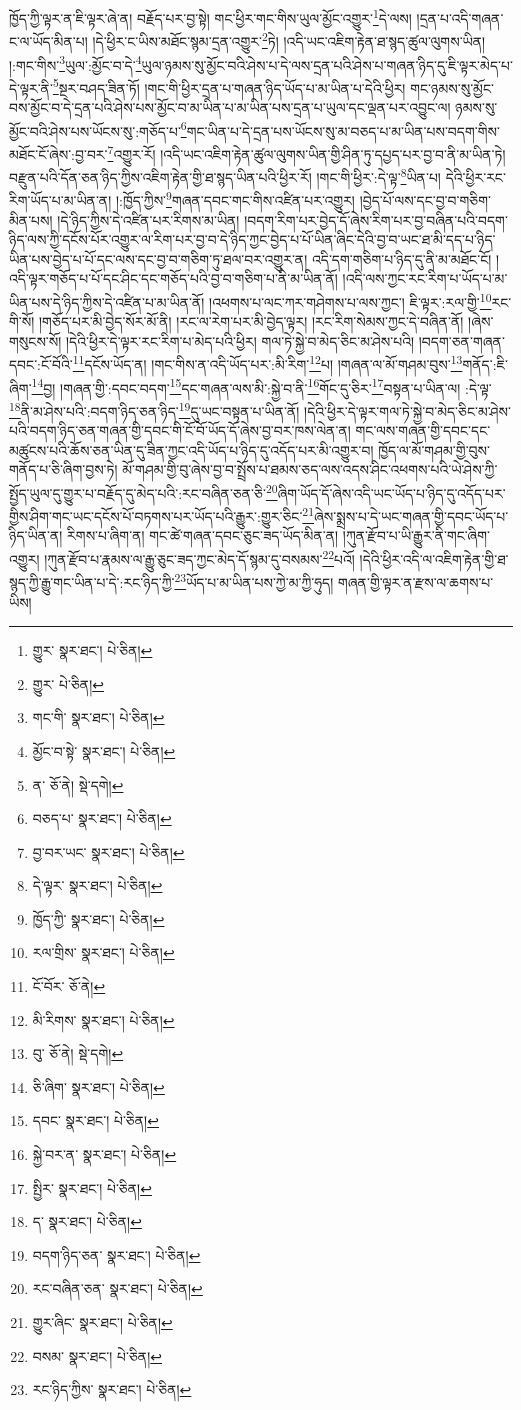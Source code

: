 ཁྱོད་ཀྱི་ལྟར་ན་ཇི་ལྟར་ཞེ་ན། བརྗོད་པར་བྱ་སྟེ། གང་ཕྱིར་གང་གིས་ཡུལ་མྱོང་འགྱུར་\footnote{གྱུར་  སྣར་ཐང་།  པེ་ཅིན། }དེ་ལས། །དྲན་པ་འདི་གཞན་ང་ལ་ཡོད་མིན་པ། །དེ་ཕྱིར་ང་ཡིས་མཐོང་སྙམ་དྲན་འགྱུར་\footnote{གྱུར་  པེ་ཅིན། }ཏེ། །འདི་ཡང་འཇིག་རྟེན་ཐ་སྙད་ཚུལ་ལུགས་ཡིན། །:གང་གིས་\footnote{གང་གི་  སྣར་ཐང་།  པེ་ཅིན། }ཡུལ་:མྱོང་བ་དེ་\footnote{མྱོང་བ་སྟེ་  སྣར་ཐང་།  པེ་ཅིན། }ཡུལ་ཉམས་སུ་མྱོང་བའི་ཤེས་པ་དེ་ལས་དྲན་པའི་ཤེས་པ་གཞན་ཉིད་དུ་ཇི་ལྟར་མེད་པ་དེ་ལྟར་ནི་\footnote{ན་  ཅོ་ནེ།  སྡེ་དགེ། }སྔར་བཤད་ཟིན་ཏོ། །གང་གི་ཕྱིར་དྲན་པ་གཞན་ཉིད་ཡོད་པ་མ་ཡིན་པ་དེའི་ཕྱིར། གང་ཉམས་སུ་མྱོང་བས་མྱོང་བ་དེ་དྲན་པའི་ཤེས་པས་མྱོང་བ་མ་ཡིན་པ་མ་ཡིན་པས་དྲན་པ་ཡུལ་དང་ལྡན་པར་འབྱུང་ལ། ཉམས་སུ་མྱོང་བའི་ཤེས་པས་ཡོངས་སུ་:གཅོད་པ་\footnote{བཅད་པ་  སྣར་ཐང་།  པེ་ཅིན། }གང་ཡིན་པ་དེ་དྲན་པས་ཡོངས་སུ་མ་བཅད་པ་མ་ཡིན་པས་བདག་གིས་མཐོང་ངོ་ཞེས་:བྱ་བར་\footnote{བྱ་བར་ཡང་  སྣར་ཐང་།  པེ་ཅིན། }འགྱུར་རོ། །འདི་ཡང་འཇིག་རྟེན་ཚུལ་ལུགས་ཡིན་གྱི་ཤིན་ཏུ་དཔྱད་པར་བྱ་བ་ནི་མ་ཡིན་ཏེ། བརྫུན་པའི་དོན་ཅན་ཉིད་ཀྱིས་འཇིག་རྟེན་གྱི་ཐ་སྙད་ཡིན་པའི་ཕྱིར་རོ། །གང་གི་ཕྱིར་:དེ་ལྟ་\footnote{དེ་ལྟར་  སྣར་ཐང་།  པེ་ཅིན། }ཡིན་པ། དེའི་ཕྱིར་རང་རིག་ཡོད་པ་མ་ཡིན་ན། །:ཁྱོད་ཀྱིས་\footnote{ཁྱོད་ཀྱི་  སྣར་ཐང་།  པེ་ཅིན། }གཞན་དབང་གང་གིས་འཛིན་པར་འགྱུར། །བྱེད་པོ་ལས་དང་བྱ་བ་གཅིག་མིན་པས། །དེ་ཉིད་ཀྱིས་དེ་འཛིན་པར་རིགས་མ་ཡིན། །བདག་རིག་པར་བྱེད་དོ་ཞེས་རིག་པར་བྱ་བཞིན་པའི་བདག་ཉིད་ལས་ཀྱི་དངོས་པོར་འགྱུར་ལ་རིག་པར་བྱ་བ་དེ་ཉིད་ཀྱང་བྱེད་པ་པོ་ཡིན་ཞིང་དེའི་བྱ་བ་ཡང་ཐ་མི་དད་པ་ཉིད་ཡིན་པས་བྱེད་པ་པོ་དང་ལས་དང་བྱ་བ་གཅིག་ཏུ་ཐལ་བར་འགྱུར་ན། འདི་དག་གཅིག་པ་ཉིད་དུ་ནི་མ་མཐོང་ངོ། །འདི་ལྟར་གཅོད་པ་པོ་དང་ཤིང་དང་གཅོད་པའི་བྱ་བ་གཅིག་པ་ནི་མ་ཡིན་ནོ། །འདི་ལས་ཀྱང་རང་རིག་པ་ཡོད་པ་མ་ཡིན་པས་དེ་ཉིད་ཀྱིས་དེ་འཛིན་པ་མ་ཡིན་ནོ། །འཕགས་པ་ལང་ཀར་གཤེགས་པ་ལས་ཀྱང་། ཇི་ལྟར་:རལ་གྱི་\footnote{རལ་གྲིས་  སྣར་ཐང་།  པེ་ཅིན། }རང་གི་སོ། །གཅོད་པར་མི་བྱེད་སོར་མོ་ནི། །རང་ལ་རེག་པར་མི་བྱེད་ལྟར། །རང་རིག་སེམས་ཀྱང་དེ་བཞིན་ནོ། །ཞེས་གསུངས་སོ། །དེའི་ཕྱིར་དེ་ལྟར་རང་རིག་པ་མེད་པའི་ཕྱིར། གལ་ཏེ་སྐྱེ་བ་མེད་ཅིང་མ་ཤེས་པའི། །བདག་ཅན་གཞན་དབང་:ངོ་བོའི་\footnote{ངོ་བོར་  ཅོ་ནེ། }དངོས་ཡོད་ན། །གང་གིས་ན་འདི་ཡོད་པར་:མི་རིག་\footnote{མི་རིགས་  སྣར་ཐང་།  པེ་ཅིན། }པ། །གཞན་ལ་མོ་གཤམ་བུས་\footnote{བུ་  ཅོ་ནེ།  སྡེ་དགེ། }གནོད་:ཇི་ཞིག་\footnote{ཅི་ཞིག་  སྣར་ཐང་།  པེ་ཅིན། }བྱ། །གཞན་གྱི་:དབང་བདག་\footnote{དབང་  སྣར་ཐང་།  པེ་ཅིན། }དང་གཞན་ལས་མི་:སྐྱེ་བ་ནི་\footnote{སྐྱེ་བར་ན་  སྣར་ཐང་།  པེ་ཅིན། }གོང་དུ་ཅིར་\footnote{སྤྱིར་  སྣར་ཐང་།  པེ་ཅིན། }བསྟན་པ་ཡིན་ལ། :དེ་ལྟ་\footnote{ད་  སྣར་ཐང་།  པེ་ཅིན། }ནི་མ་ཤེས་པའི་:བདག་ཉིད་ཅན་ཉིད་\footnote{བདག་ཉིད་ཅན་  སྣར་ཐང་།  པེ་ཅིན། }དུ་ཡང་བསྟན་པ་ཡིན་ནོ། །དེའི་ཕྱིར་དེ་ལྟར་གལ་ཏེ་སྐྱེ་བ་མེད་ཅིང་མ་ཤེས་པའི་བདག་ཉིད་ཅན་གཞན་གྱི་དབང་གི་ངོ་བོ་ཡོད་དོ་ཞེས་བྱ་བར་ཁས་ལེན་ན། གང་ལས་གཞན་གྱི་དབང་དང་མཚུངས་པའི་ཆོས་ཅན་ཡིན་དུ་ཟིན་ཀྱང་འདི་ཡོད་པ་ཉིད་དུ་འདོད་པར་མི་འགྱུར་བ། ཁྱོད་ལ་མོ་གཤམ་གྱི་བུས་གནོད་པ་ཅི་ཞིག་བྱས་ཏེ། མོ་གཤམ་གྱི་བུ་ཞེས་བྱ་བ་སྤྲོས་པ་ཐམས་ཅད་ལས་འདས་ཤིང་འཕགས་པའི་ཡེ་ཤེས་ཀྱི་སྤྱོད་ཡུལ་དུ་གྱུར་པ་བརྗོད་དུ་མེད་པའི་:རང་བཞིན་ཅན་ཅི་\footnote{རང་བཞིན་ཅན་  སྣར་ཐང་།  པེ་ཅིན། }ཞིག་ཡོད་དོ་ཞེས་འདི་ཡང་ཡོད་པ་ཉིད་དུ་འདོད་པར་གྱིས་ཤིག་གང་ཡང་དངོས་པོ་བཏགས་པར་ཡོད་པའི་རྒྱུར་:གྱུར་ཅིང་\footnote{གྱུར་ཞིང་  སྣར་ཐང་།  པེ་ཅིན། }ཞེས་སྨྲས་པ་དེ་ཡང་གཞན་གྱི་དབང་ཡོད་པ་ཉིད་ཡིན་ན། རིགས་པ་ཞིག་ན། གང་ཚེ་གཞན་དབང་ཅུང་ཟད་ཡོད་མིན་ན། །ཀུན་རྫོབ་པ་ཡི་རྒྱུར་ནི་གང་ཞིག་འགྱུར། །ཀུན་རྫོབ་པ་རྣམས་ལ་རྒྱུ་ཅུང་ཟད་ཀྱང་མེད་དོ་སྙམ་དུ་བསམས་\footnote{བསམ་  སྣར་ཐང་།  པེ་ཅིན། }པའོ། །དེའི་ཕྱིར་འདི་ལ་འཇིག་རྟེན་གྱི་ཐ་སྙད་ཀྱི་རྒྱུ་གང་ཡིན་པ་དེ་:རང་ཉིད་ཀྱི་\footnote{རང་ཉིད་ཀྱིས་  སྣར་ཐང་།  པེ་ཅིན། }ཡོད་པ་མ་ཡིན་པས་ཀྱེ་མ་ཀྱི་ཧུད། གཞན་གྱི་ལྟར་ན་རྫས་ལ་ཆགས་པ་ཡིས། 